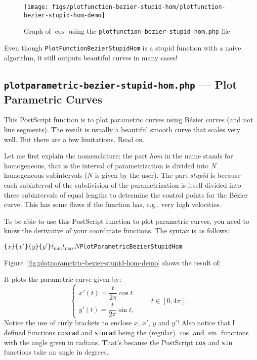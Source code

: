 \documentclass[10pt,a4paper]{scrartcl}
\newcommand\PS{PostScript}
\begin{document}
\begin{figure}[ht!]%
\centering
\texttt{[image: figs/plotfunction-bezier-stupid-hom/plotfunction-bezier-stupid-hom-demo]}%
\caption{Graph of $\cos$ using the \texttt{plotfunction-bezier-stupid-hom.php} file}%
\label{fig:plotfunction-bezier-stupid-hom-demo}%
\end{figure}

Even though \texttt{PlotFunctionBezierStupidHom} is a stupid function with a
naive algorithm, it still outputs beautiful curves in many cases!

\subsection{\texttt{plotparametric-bezier-stupid-hom.php} --- Plot Parametric Curves}
This \PS{} function is to plot parametric curves using B\'ezier curves (and not
line segments). The result is usually a beautiful smooth curve that scales very
well. But there are a few limitations. Read on.

Let me first explain the nomenclature: the part \emph{hom} in the name stands
for homogeneous, that is the interval of parametrization is divided into $N$
homogeneous subintervals ($N$ is given by the user). The part \emph{stupid} is
because each subinterval of the subdivision of the parametrization is itself
divided into three subintervals of equal lengths to determine the control
points for the B\'ezier curve. This has some flaws if the function has, e.g.,
very high velocities.

To be able to use this \PS{} function to plot parametric curves, you need to
know the derivative of your coordinate functions. The syntax is as follows:
\begin{center}
\texttt{\{}$x$\texttt{\}}\quad\texttt{\{}$x'$\texttt{\}}\quad\texttt{\{}$y$\texttt{\}}\quad\texttt{\{}$y'$\texttt{\}}\quad$t_{\text{min}}$\quad$t_{\text{max}}$\quad$N$\quad\texttt{PlotParametricBezierStupidHom}
\end{center}

Figure~\ref{fig:plotparametric-bezier-stupid-hom-demo} shows the result of:

It plots the parametric curve given by:
\[\begin{cases}
x'(t)=\dfrac t{2\pi}\cos t\\
y'(t)=\dfrac t{2\pi}\sin t,
\end{cases}\qquad t\in[0,4\pi].\]
Notice the use of curly brackets to enclose $x$, $x'$, $y$ and $y'$! Also notice that I
defined functions \texttt{cosrad} and \texttt{sinrad} being the (regular)
$\cos$ and $\sin$ functions with the angle given in radians. That's because the
\PS{} \texttt{cos} and \texttt{sin} functions take an angle in degrees.
\end{document}
